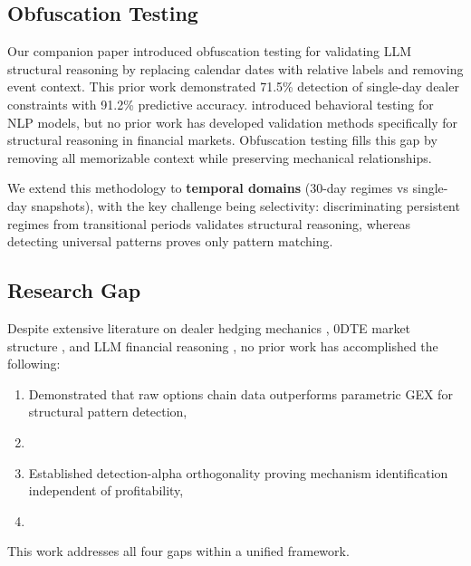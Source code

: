 \documentclass[jrfm,article,accept,moreauthors,pdftex]{Definitions/mdpi}
\begin{document}
\subsection{Obfuscation Testing}

Our companion paper \citep{regan2025obfuscation} introduced obfuscation testing for validating LLM structural reasoning by replacing calendar dates with relative labels and removing event context. This prior work demonstrated 71.5\% detection of single-day dealer constraints with 91.2\% predictive accuracy. \citet{ribeiro2020beyond} introduced behavioral testing for NLP models, but no prior work has developed validation methods specifically for structural reasoning in financial markets. Obfuscation testing fills this gap by removing all memorizable context while preserving mechanical relationships.

We extend this methodology to \textbf{temporal domains} (30-day regimes vs single-day snapshots), with the key challenge being selectivity: discriminating persistent regimes from transitional periods validates structural reasoning, whereas detecting universal patterns proves only pattern matching.

\subsection{Research Gap}

Despite extensive literature on dealer hedging mechanics \citep{ni2005stock,garleanu2009demand}, 0DTE market structure \citep{dim2023odtes,adams2025zerodte}, and LLM financial reasoning \citep{lopez2023can,lopezlira2025memorization}, no prior work has accomplished the following:
\begin{enumerate}
\item Demonstrated that raw options chain data outperforms parametric GEX for structural pattern detection,
\item {}
\item Established detection-alpha orthogonality proving mechanism identification independent of profitability,
\item {}
\end{enumerate}

{This} %
 work addresses all four gaps within a unified framework.
\end{document}
